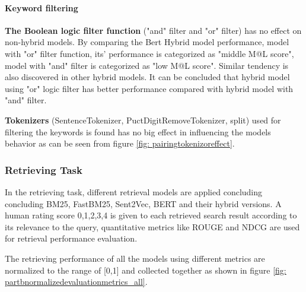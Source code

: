 \documentclass[10pt,a4paper,fleqn]{report}
\begin{document}
			\paragraph{Keyword filtering} %
			
				\textbf{The Boolean logic filter function} ("and" filter and "or" filter) has no effect on non-hybrid models.
				By comparing the Bert Hybrid model performance, model with "or" filter function, its' performance is categorized as "middle M@L score", model with "and" filter is categorized as "low M@L score". Similar tendency is also discovered in other hybrid models. It can be concluded that hybrid model using "or" logic filter has better performance compared with hybrid model with "and" filter.
				
				\textbf{Tokenizers} (SentenceTokenizer,  PuctDigitRemoveTokenizer, split) used for filtering the keywords is found has no big effect in influencing the models behavior as can be seen from figure \ref{fig: pairingtokenizoreffect}.					
				
			
		\subsubsection{Retrieving Task}
			In the retrieving task, different retrieval models are applied concluding concluding BM25, FastBM25, Sent2Vec, BERT and their hybrid versions.
			A human rating score {0,1,2,3,4} is given to each retrieved search result according to its relevance to the query, quantitative metrics like ROUGE and NDCG are used for retrieval performance evaluation.
			
			The retrieving performance of all the models using different metrics are normalized to the range of [0,1] and collected together as shown in figure \ref{fig: partbnormalizedevaluationmetrics_all}.
			
\end{document}
